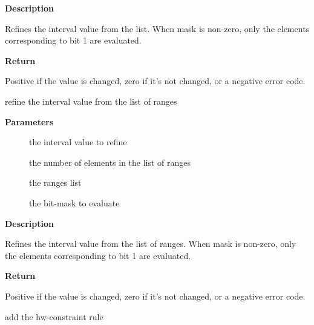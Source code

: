 \documentclass[a4paper,8pt,english]{sphinxmanual}
\begin{document}
\textbf{Description}

Refines the interval value from the list.
When mask is non-zero, only the elements corresponding to bit 1 are
evaluated.

\textbf{Return}

Positive if the value is changed, zero if it's not changed, or a
negative error code.

\begin{fulllineitems}
\label{sound/kernel-api/alsa-driver-api:c.snd_interval_ranges}
refine the interval value from the list of ranges

\end{fulllineitems}


\textbf{Parameters}
\begin{description}
\item[{}] \leavevmode
the interval value to refine

\item[{}] \leavevmode
the number of elements in the list of ranges

\item[{}] \leavevmode
the ranges list

\item[{}] \leavevmode
the bit-mask to evaluate

\end{description}

\textbf{Description}

Refines the interval value from the list of ranges.
When mask is non-zero, only the elements corresponding to bit 1 are
evaluated.

\textbf{Return}

Positive if the value is changed, zero if it's not changed, or a
negative error code.

\begin{fulllineitems}
\label{sound/kernel-api/alsa-driver-api:c.snd_pcm_hw_rule_add}
add the hw-constraint rule

\end{fulllineitems}
\end{document}
